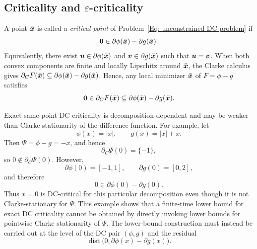 \documentclass[english]{article}
\begin{document}
\subsection{Criticality and $\varepsilon$-criticality}
\label{sec:finite-time-barrier}
A point $\bar{\bm{x}}$ is called a \emph{critical point} of Problem~\eqref{Eq: unconstrained DC problem} if
\begin{equation}
    \label{def:dc-critical}
    \bm{0}\in \partial\phi(\bar{\bm{x}})-\partial g(\bar{\bm{x}}).
\end{equation}
Equivalently, there exist $\bm{u}\in\partial\phi(\bar{\bm{x}})$ and $\bm{v}\in\partial g(\bar{\bm{x}})$ such that $\bm{u}=\bm{v}$. When both convex components are finite and locally Lipschitz around $\bar{\bm{x}}$, the Clarke calculus gives $\partial_C F(\bar{\bm{x}}) \subseteq \partial\phi(\bar{\bm{x}})-\partial g(\bar{\bm{x}})$. Hence, any local minimizer $\bar{\bm{x}}$ of $F=\phi-g$ satisfies
\[
    \bm{0}\in\partial_C F(\bar{\bm{x}}) \subseteq \partial\phi(\bar{\bm{x}})-\partial g(\bar{\bm{x}}).
\]

Exact same-point DC criticality is decomposition-dependent and may be
 weaker than Clarke stationarity of the difference function. For
example, let
\[
    \phi(x)=|x|,\qquad g(x)=|x|+x .
\]
Then \(\Psi=\phi-g=-x\), and hence
\[
    \partial_C\Psi(0)=\{-1\},
\]
so \(0\notin\partial_C\Psi(0)\). However,
\[
    \partial\phi(0)=[-1,1],\qquad \partial g(0)=[0,2],
\]
and therefore
\[
    0\in \partial\phi(0)-\partial g(0).
\]
Thus \(x=0\) is DC-critical for this particular decomposition even though
it is not Clarke-stationary for \(\Psi\). This example shows that a
finite-time lower bound for exact DC criticality cannot be obtained by
directly invoking lower bounds for pointwise Clarke stationarity of
\(\Psi\). The lower-bound construction must instead be carried out at the
level of the DC pair \((\phi,g)\) and the residual
\[
    \operatorname{dist}\bigl(0,\partial\phi(x)-\partial g(x)\bigr).
\]
\end{document}
